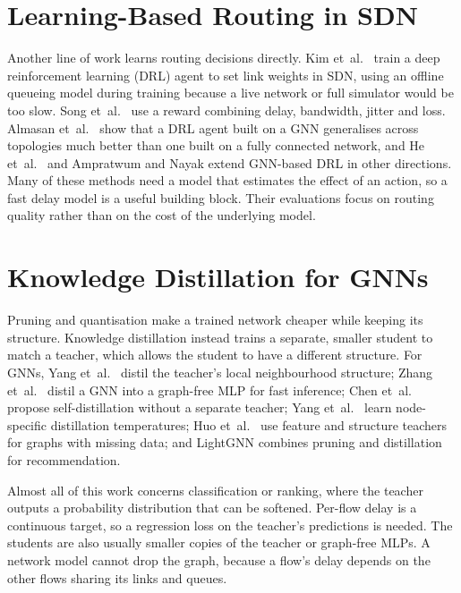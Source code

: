\section{Learning-Based Routing in SDN}

Another line of work learns routing decisions directly. Kim et~al.\ \cite{kim2022drlsdn} train a deep reinforcement learning (DRL) agent to set link weights in SDN, using an offline queueing model during training because a live network or full simulator would be too slow. Song et~al.\ \cite{song2024qosdrl} use a reward combining delay, bandwidth, jitter and loss. Almasan et~al.\ \cite{almasan2022drlgnn} show that a DRL agent built on a GNN generalises across topologies much better than one built on a fully connected network, and He et~al.\ \cite{he2024causality} and Ampratwum and Nayak \cite{ampratwum2025wdm} extend GNN-based DRL in other directions. Many of these methods need a model that estimates the effect of an action, so a fast delay model is a useful building block. Their evaluations focus on routing quality rather than on the cost of the underlying model.

\section{Knowledge Distillation for GNNs}

Pruning \cite{han2016deepcompression} and quantisation \cite{jacob2018quantization} make a trained network cheaper while keeping its structure. Knowledge distillation \cite{hinton2015distilling,gou2021kdsurvey} instead trains a separate, smaller student to match a teacher, which allows the student to have a different structure. For GNNs, Yang et~al.\ \cite{yang2020lsp} distil the teacher's local neighbourhood structure; Zhang et~al.\ \cite{zhang2022glnn} distil a GNN into a graph-free MLP for fast inference; Chen et~al.\ \cite{chen2021gnnsd} propose self-distillation without a separate teacher; Yang et~al.\ \cite{yang2023ltd} learn node-specific distillation temperatures; Huo et~al.\ \cite{huo2023t2gnn} use feature and structure teachers for graphs with missing data; and LightGNN \cite{chen2025lightgnn} combines pruning and distillation for recommendation.

Almost all of this work concerns classification or ranking, where the teacher outputs a probability distribution that can be softened. Per-flow delay is a continuous target, so a regression loss on the teacher's predictions is needed. The students are also usually smaller copies of the teacher or graph-free MLPs. A network model cannot drop the graph, because a flow's delay depends on the other flows sharing its links and queues.

